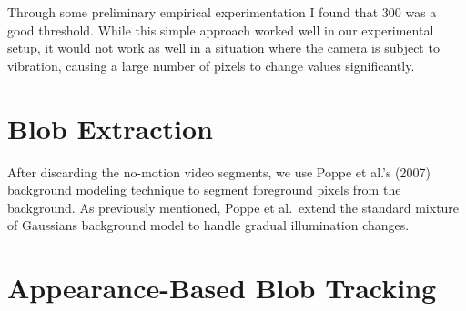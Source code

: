 Through some preliminary empirical experimentation I found that 300 was a good 
threshold. While this simple approach worked well in our experimental setup, 
it would not work as well in a situation where the camera is subject to 
vibration, causing a large number of pixels to change values significantly.

\section{Blob Extraction}
\label{sec:blob-blob-extraction}

After discarding the no-motion video segments, we use Poppe et al.'s
(2007) background modeling technique\nocite{poppe07background} to
segment foreground pixels from the background. As previously
mentioned, Poppe et al.\ extend the standard mixture of Gaussians
background model
 to handle gradual illumination changes.

\section{Appearance-Based Blob Tracking}
\label{sec:blob-appearance-based-blob-tracking}

